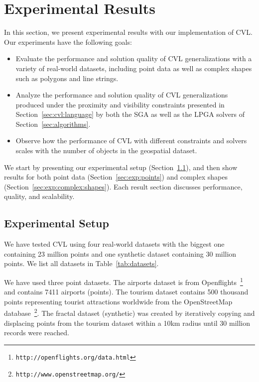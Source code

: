 \section{Experimental Results}
\label{sec:experimental}


In this section, we present experimental results with our implementation of CVL. Our experiments have the following goals:

\begin{itemize}

\item Evaluate the performance and solution quality of CVL generalizations with a variety of real-world datasets, including point data as well as complex shapes such as polygons and line strings. 

\item Analyze the performance and solution quality of CVL generalizations produced under the proximity and visibility constraints presented in Section~\ref{sec:cvl:language} by both the SGA as well as the LPGA solvers of Section~\ref{sec:algorithms}.

\item Observe how the performance of CVL with different constraints and solvers scales with the number of objects in the geospatial dataset.

\end{itemize}

We start by presenting our experimental setup (Section~\ref{sec:exp:setup}), and then show results for both point data (Section~\ref{sec:exp:points}) and complex shapes (Section~\ref{sec:exp:complex:shapes}). Each result section discusses performance, quality, and scalability. 


\subsection{Experimental Setup}
\label{sec:exp:setup}

We have tested CVL using four real-world datasets with the biggest one containing 23 million points and one synthetic dataset containing 30 million points. We list all datasets in Table~\ref{tab:datasets}. 

We have used three point datasets. The airports dataset is from Openflights~\footnote{\texttt{http://openflights.org/data.html}} and contains 7411 airports (points). The tourism dataset contains 500 thousand points representing tourist attractions worldwide from the OpenStreetMap database~\footnote{\texttt{http://www.openstreetmap.org/}}. The fractal dataset (synthetic) was created by iteratively copying and displacing points from the tourism dataset within a 10km radius until 30 million records were reached.

